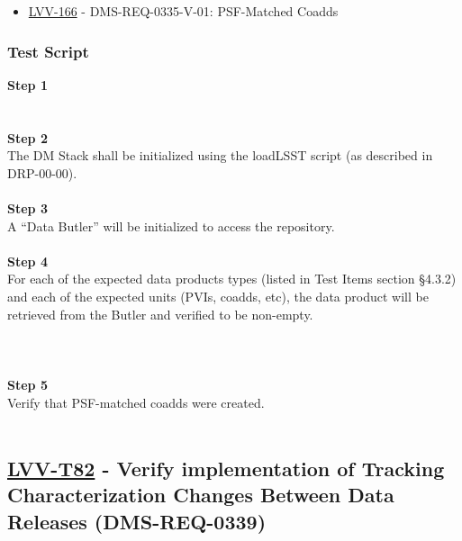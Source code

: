 \begin{itemize}
\tightlist
\item
  \href{https://jira.lsstcorp.org/browse/LVV-166}{LVV-166} -
  DMS-REQ-0335-V-01: PSF-Matched Coadds
\end{itemize}

\hypertarget{test-script-13}{%
\subsubsection{Test Script}\label{test-script-13}}

\textbf{Step 1}\\
~\\
~\\
\textbf{Step 2}\\
The DM Stack shall be initialized using the loadLSST script (as
described in DRP-00-00).\\
~\\
\textbf{Step 3}\\
A ``Data Butler'' will be initialized to access the repository.\\
~\\
\textbf{Step 4}\\
For each of the expected data products types (listed in Test Items
section §4.3.2) and each of the expected units (PVIs, coadds, etc), the
data product will be retrieved from the Butler and verified to be
non-empty.\\
~\\
~\\
~\\
\textbf{Step 5}\\
Verify that PSF-matched coadds were created.\\
~\\

\hypertarget{lvv-t82---verify-implementation-of-tracking-characterization-changes-between-data-releases-dms-req-0339}{%
\subsection{\texorpdfstring{\href{https://jira.lsstcorp.org/secure/Tests.jspa\#/testCase/LVV-T82}{LVV-T82}
- Verify implementation of Tracking Characterization Changes Between
Data Releases
(DMS-REQ-0339)}{LVV-T82 - Verify implementation of Tracking Characterization Changes Between Data Releases (DMS-REQ-0339)}}\label{lvv-t82---verify-implementation-of-tracking-characterization-changes-between-data-releases-dms-req-0339}}

